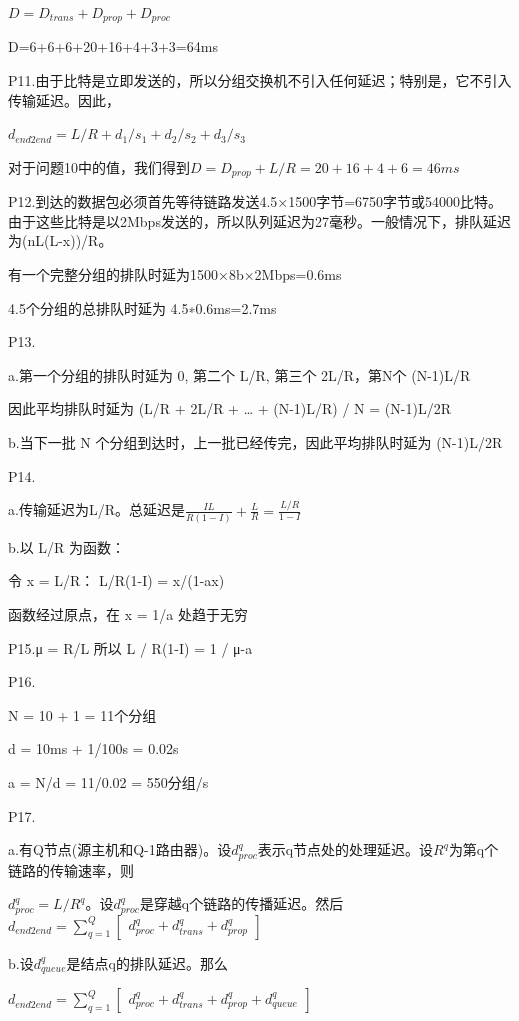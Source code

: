 \documentclass[11pt,UTF8,twoside]{article}
\begin{document}
	$D=D_{trans}+D_{prop}+D_{proc}$
	
	D=6+6+6+20+16+4+3+3=64ms
	
	P11.由于比特是立即发送的，所以分组交换机不引入任何延迟；特别是，它不引入传输延迟。因此，
	
	$d_{end2end}=L/R+d_1/s_1+d_2/s_2+d_3/s_3$
	
	对于问题10中的值，我们得到$D=D_{prop}+L/R=20+16+4+6=46ms$
	
	P12.到达的数据包必须首先等待链路发送4.5×1500字节=6750字节或54000比特。由于这些比特是以2Mbps发送的，所以队列延迟为27毫秒。一般情况下，排队延迟为(nL(L-x))/R。
	
	有一个完整分组的排队时延为1500×8b×2Mbps=0.6ms
	
	4.5个分组的总排队时延为 4.5∗0.6ms=2.7ms
	
	P13.
	
	a.第一个分组的排队时延为 0, 第二个 L/R, 第三个 2L/R，第N个 (N-1)L/R
	
	因此平均排队时延为 (L/R + 2L/R + … + (N-1)L/R) / N = (N-1)L/2R
	
	b.当下一批 N 个分组到达时，上一批已经传完，因此平均排队时延为 (N-1)L/2R
	
	P14.
	
	a.传输延迟为L/R。总延迟是$\frac{IL}{R(1-I)}+\frac{L}{R}=\frac{L/R}{1-I}$
	
	b.以 L/R 为函数：
	
	令 x = L/R： L/R(1-I) = x/(1-ax)
	
	函数经过原点，在 x = 1/a 处趋于无穷
	
	P15.μ = R/L 所以 L / R(1-I) = 1 / μ-a
	
	P16.
	
	N = 10 + 1 = 11个分组
	
	d = 10ms + 1/100s = 0.02s
	
	a = N/d = 11/0.02 = 550分组/s
	
	P17.
	
	a.有Q节点(源主机和Q-1路由器)。设$d_{proc}^{q}$表示q节点处的处理延迟。设$R^q$为第q个链路的传输速率，则
	
	$d_{proc}^{q}=L/R^q$。设$d_{proc}^{q}$是穿越q个链路的传播延迟。然后$d_{end2end}=\sum_{q=1}^{Q}\begin{bmatrix}
	d_{proc}^{q}+d_{trans}^{q}+d_{prop}^{q}
	\end{bmatrix}$
	
	b.设$d_{queue}^{q}$是结点q的排队延迟。那么
	
	$d_{end2end}=\sum_{q=1}^{Q}\begin{bmatrix}
	d_{proc}^{q}+d_{trans}^{q}+d_{prop}^{q}+d_{queue}^{q}
	\end{bmatrix}$
	
\end{document}
